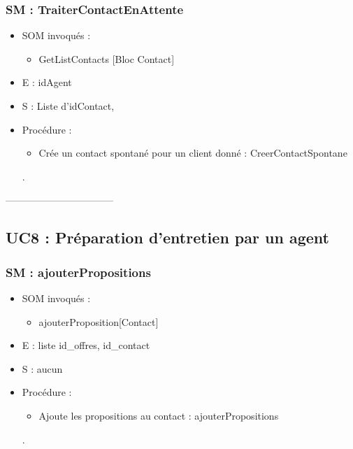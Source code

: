 \subsubsection{SM : TraiterContactEnAttente}
\begin{itemize}
	\item SOM invoqués : 
		\begin{itemize}
			\item GetListContacts [Bloc Contact]
		\end{itemize}
	\item E : idAgent
	\item S : Liste d’idContact, 
	\item Procédure : 
		\begin{itemize}
			\item Crée un contact spontané pour un client donné : CreerContactSpontane
		\end{itemize}.
\end{itemize}

---------------------------------
\subsection{UC8 : Préparation d’entretien par un agent}
\subsubsection{SM : ajouterPropositions}
\begin{itemize}
	\item SOM invoqués :
	\begin{itemize}
		\item ajouterProposition[Contact]
	\end{itemize}
	\item E : liste id\_offres, id\_contact
	\item S : aucun
	\item Procédure :
	\begin{itemize}
		\item Ajoute les propositions au contact : ajouterPropositions
	\end{itemize}.
\end{itemize}

